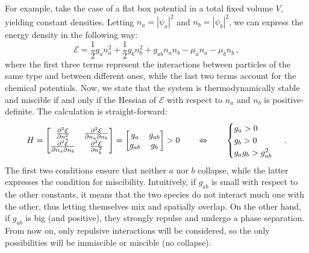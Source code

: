 For example, take the case of a flat box potential in a total fixed volume $V$, yielding constant densities. Letting $n_a = |\psi_a|^2$ and $n_b = |\psi_b|^2$, we can express the energy density in the following way:
\begin{equation*}
    \mathcal{E} = \frac{1}{2}g_a n_a^2 + \frac{1}{2}g_b n_b^2 + g_{ab}n_a n_b - \mu_a n_a - \mu_b n_b\, ,
\end{equation*}
where the first three terms represent the interactions between particles of the same type and between different ones, while the last two terms account for the chemical potentials. Now, we state that the system is thermodynamically stable and miscible if and only if the Hessian of $\mathcal{E}$ with respect to $n_a$ and $n_b$ is positive-definite. The calculation is straight-forward:
\begin{equation*}
    H = 
    \begin{bmatrix}
        \pdv[2]{\mathcal{E}}{n_a} &  \pdv{\mathcal{E}}{n_a}{n_b} \\
        \pdv{\mathcal{E}}{n_a}{n_b} &  \pdv[2]{\mathcal{E}}{n_b}
    \end{bmatrix} = 
    \begin{bmatrix}
        g_a &  g_{ab} \\
        g_{ab} &  g_b
    \end{bmatrix} > 0
    \qquad \Leftrightarrow \qquad
    \begin{cases}
        g_a > 0 \\
        g_b > 0 \\
        g_a g_b > g_{ab}^2
    \end{cases}\, .
\end{equation*}
The first two conditions ensure that neither $a$ nor $b$ collapse, while the latter expresses the condition for miscibility. Intuitively, if $g_{ab}$ is small with respect to the other constants, it means that the two species do not interact much one with the other, thus letting themselves mix and spatially overlap. On the other hand, if $g_{ab}$ is big (and positive), they strongly repulse and undergo a phase separation. From now on, only repulsive interactions will be considered, so the only possibilities will be immiscible or miscible (no collapse).

